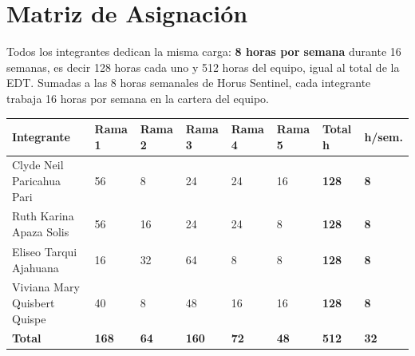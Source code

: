 \documentclass[11pt,a4paper]{article}
\begin{document}
\section{Matriz de Asignación}
Todos los integrantes dedican la misma carga: \textbf{8 horas por semana} durante 16 semanas, es decir 128 horas cada uno y 512 horas del equipo, igual al total de la EDT. Sumadas a las 8 horas semanales de Horus Sentinel, cada integrante trabaja 16 horas por semana en la cartera del equipo.

\vspace{0.1cm}
{\small
\setlength{\tabcolsep}{4pt}
\noindent\begin{tabularx}{\textwidth}{@{}L C{1.0cm} C{1.0cm} C{1.0cm} C{1.0cm} C{1.0cm} C{1.1cm} C{1.1cm}@{}}
\toprule
{}
\textbf{Integrante} & \textcolor{Rama1}{\textbf{Rama 1}} & \textcolor{Rama2}{\textbf{Rama 2}} & \textcolor{Rama3}{\textbf{Rama 3}} & \textcolor{Rama4}{\textbf{Rama 4}} & \textcolor{Rama5}{\textbf{Rama 5}} & \textbf{Total h} & \textbf{h/sem.} \\
\midrule
Clyde Neil Paricahua Pari & 56 & 8 & 24 & 24 & 16 & \textbf{128} & \textbf{8} \\
Ruth Karina Apaza Solis & 56 & 16 & 24 & 24 & 8 & \textbf{128} & \textbf{8} \\
Eliseo Tarqui Ajahuana & 16 & 32 & 64 & 8 & 8 & \textbf{128} & \textbf{8} \\
Viviana Mary Quisbert Quispe & 40 & 8 & 48 & 16 & 16 & \textbf{128} & \textbf{8} \\
\midrule
\textbf{Total} & \textbf{168} & \textbf{64} & \textbf{160} & \textbf{72} & \textbf{48} & \textbf{512} & \textbf{32} \\
\bottomrule
\end{tabularx}
}
\end{document}
